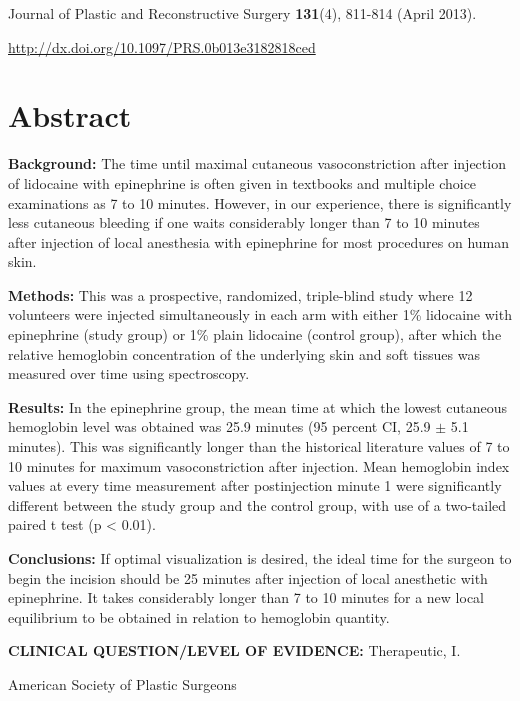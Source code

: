 \noindent Journal of Plastic and Reconstructive Surgery \textbf{131}(4), 811-814 (April 2013).

\noindent \url{http://dx.doi.org/10.1097/PRS.0b013e3182818ced}

\section*{Abstract}

\noindent \textbf{Background:} The time until maximal cutaneous vasoconstriction after injection of lidocaine with epinephrine is often given in textbooks and multiple choice examinations as 7 to 10 minutes. However, in our experience, there is significantly less cutaneous bleeding if one waits considerably longer than 7 to 10 minutes after injection of local anesthesia with epinephrine for most procedures on human skin.

\noindent \textbf{Methods:} This was a prospective, randomized, triple-blind study where 12 volunteers were injected simultaneously in each arm with either 1\% lidocaine with epinephrine (study group) or 1\% plain lidocaine (control group), after which the relative hemoglobin concentration of the underlying skin and soft tissues was measured over time using spectroscopy.

\noindent \textbf{Results:} In the epinephrine group, the mean time at which the lowest cutaneous hemoglobin level was obtained was 25.9 minutes (95 percent CI, 25.9 $\pm$ 5.1 minutes). This was significantly longer than the historical literature values of 7 to 10 minutes for maximum vasoconstriction after injection. Mean hemoglobin index values at every time measurement after postinjection minute 1 were significantly different between the study group and the control group, with use of a two-tailed paired t test (p < 0.01).

\noindent \textbf{Conclusions:} If optimal visualization is desired, the ideal time for the surgeon to begin the incision should be 25 minutes after injection of local anesthetic with epinephrine. It takes considerably longer than 7 to 10 minutes for a new local equilibrium to be obtained in relation to hemoglobin quantity.

\noindent \textbf{CLINICAL QUESTION/LEVEL OF EVIDENCE:} Therapeutic, I.

\noindent {} American Society of Plastic Surgeons

